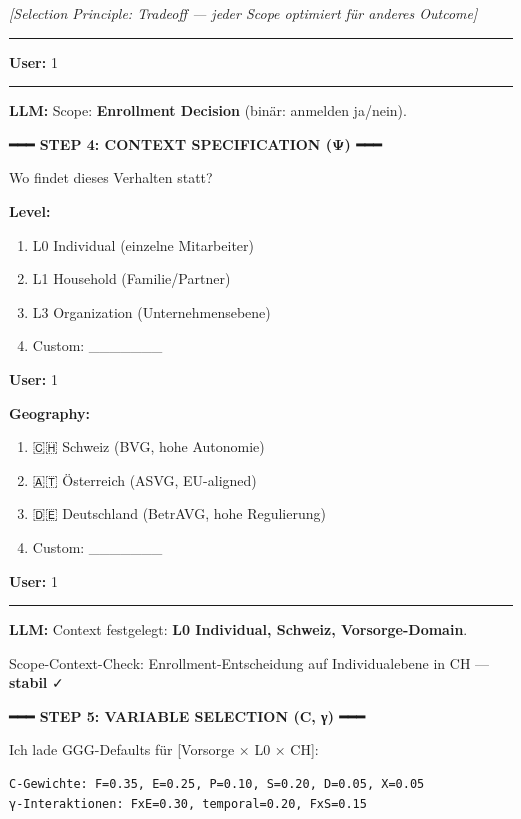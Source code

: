 \begin{tcolorbox}[colback=blue!5!white, colframe=blue!75!black,
    title=Example: GEFÜHRT Model Design (All 10 Steps), breakable]
\textit{[Selection Principle: Tradeoff --- jeder Scope optimiert für anderes Outcome]}

\hrule
\vspace{0.3em}

\textbf{User:} 1

\hrule
\vspace{0.3em}

\textbf{LLM:} Scope: \textbf{Enrollment Decision} (binär: anmelden ja/nein).

\vspace{0.3em}
\textbf{━━━ STEP 4: CONTEXT SPECIFICATION (Ψ) ━━━}
\vspace{0.3em}

Wo findet dieses Verhalten statt?

\textbf{Level:}
\begin{enumerate}
\item L0 Individual (einzelne Mitarbeiter)
\item L1 Household (Familie/Partner)
\item L3 Organization (Unternehmensebene)
\item Custom: \_\_\_\_\_\_\_
\end{enumerate}

\textbf{User:} 1

\textbf{Geography:}
\begin{enumerate}
\item 🇨🇭 Schweiz (BVG, hohe Autonomie)
\item 🇦🇹 Österreich (ASVG, EU-aligned)
\item 🇩🇪 Deutschland (BetrAVG, hohe Regulierung)
\item Custom: \_\_\_\_\_\_\_
\end{enumerate}

\textbf{User:} 1

\hrule
\vspace{0.3em}

\textbf{LLM:} Context festgelegt: \textbf{L0 Individual, Schweiz, Vorsorge-Domain}.

Scope-Context-Check: Enrollment-Entscheidung auf Individualebene in CH --- \textbf{stabil} ✓

\vspace{0.3em}
\textbf{━━━ STEP 5: VARIABLE SELECTION (C, γ) ━━━}
\vspace{0.3em}

Ich lade GGG-Defaults für [Vorsorge × L0 × CH]:
\begin{verbatim}
C-Gewichte: F=0.35, E=0.25, P=0.10, S=0.20, D=0.05, X=0.05
γ-Interaktionen: FxE=0.30, temporal=0.20, FxS=0.15
\end{verbatim}


\end{tcolorbox}
